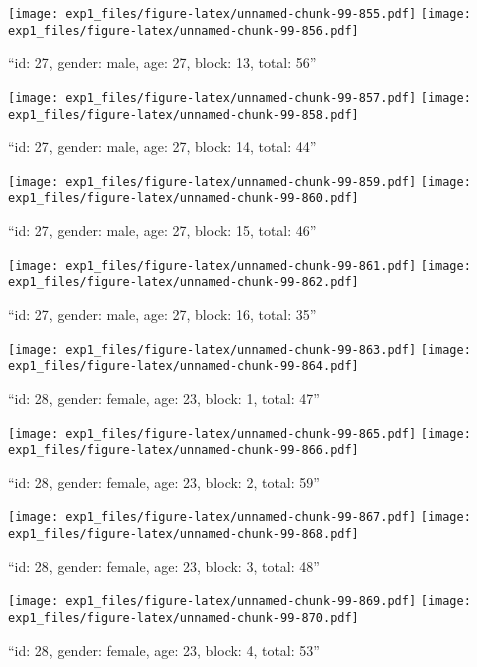 \documentclass[,]{article}
\begin{document}
\texttt{[image: exp1\_files/figure-latex/unnamed-chunk-99-855.pdf]}
\texttt{[image: exp1\_files/figure-latex/unnamed-chunk-99-856.pdf]}

\newpage
[1] 

``id: 27, gender: male, age: 27, block: 13, total: 56''

\texttt{[image: exp1\_files/figure-latex/unnamed-chunk-99-857.pdf]}
\texttt{[image: exp1\_files/figure-latex/unnamed-chunk-99-858.pdf]}

\newpage
[1] 

``id: 27, gender: male, age: 27, block: 14, total: 44''

\texttt{[image: exp1\_files/figure-latex/unnamed-chunk-99-859.pdf]}
\texttt{[image: exp1\_files/figure-latex/unnamed-chunk-99-860.pdf]}

\newpage
[1] 

``id: 27, gender: male, age: 27, block: 15, total: 46''

\texttt{[image: exp1\_files/figure-latex/unnamed-chunk-99-861.pdf]}
\texttt{[image: exp1\_files/figure-latex/unnamed-chunk-99-862.pdf]}

\newpage
[1] 

``id: 27, gender: male, age: 27, block: 16, total: 35''

\texttt{[image: exp1\_files/figure-latex/unnamed-chunk-99-863.pdf]}
\texttt{[image: exp1\_files/figure-latex/unnamed-chunk-99-864.pdf]}

\newpage
[1] 

``id: 28, gender: female, age: 23, block: 1, total: 47''

\texttt{[image: exp1\_files/figure-latex/unnamed-chunk-99-865.pdf]}
\texttt{[image: exp1\_files/figure-latex/unnamed-chunk-99-866.pdf]}

\newpage
[1] 

``id: 28, gender: female, age: 23, block: 2, total: 59''

\texttt{[image: exp1\_files/figure-latex/unnamed-chunk-99-867.pdf]}
\texttt{[image: exp1\_files/figure-latex/unnamed-chunk-99-868.pdf]}

\newpage
[1] 

``id: 28, gender: female, age: 23, block: 3, total: 48''

\texttt{[image: exp1\_files/figure-latex/unnamed-chunk-99-869.pdf]}
\texttt{[image: exp1\_files/figure-latex/unnamed-chunk-99-870.pdf]}

\newpage
[1] 

``id: 28, gender: female, age: 23, block: 4, total: 53''
\end{document}

